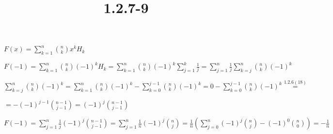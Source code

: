 \documentclass{article}
\title{1.2.7-9}
\begin{document}
\maketitle

\( F(x) = \sum_{k=1}^n \binom{n}{k} x^kH_k \)

\( F(-1) = \sum_{k=1}^n \binom{n}{k} (-1)^k H_k = \sum_{k=1}^n \binom{n}{k} (-1)^k \sum_{j=1}^k \frac{1}{j} = \sum_{j=1}^n \frac{1}{j} \sum_{k=j}^n \binom{n}{k} (-1)^k \)

\( \sum_{k=j}^n \binom{n}{k} (-1)^k = \sum_{k=1}^n \binom{n}{k} (-1)^k - \sum_{k=0}^{j-1} \binom{n}{k} (-1)^k = 0 - \sum_{k=0}^{j-1} \binom{n}{k} (-1)^k \overset{1.2.6(18)}{=} \)

\( = -(-1)^{j-1} \binom{n-1}{j-1} = (-1)^{j} \binom{n-1}{j-1} \)

\( F(-1) = \sum_{j=1}^n \frac{1}{j} (-1)^{j} \binom{n-1}{j-1} = \sum_{j=1}^n \frac{1}{n} (-1)^{j} \binom{n}{j} = \frac{1}{n} (\sum_{j=0}^n (-1)^{j} \binom{n}{j} - (-1)^0\binom{n}{0}) = -\frac{1}{n} \)
\end{document}
